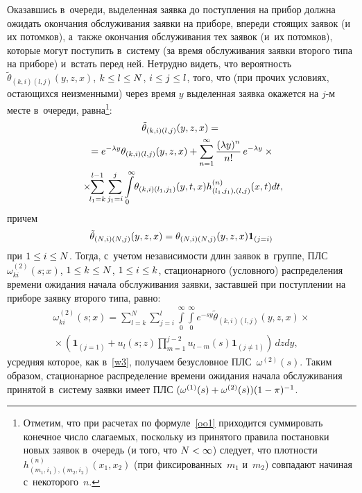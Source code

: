\begin{multicols}{2}
Оказавшись в~очереди, выделенная заявка до поступления 
на прибор должна ожидать окончания обслуживания заявки на 
приборе, впереди стоящих заявок (и их потомков), 
а~также окончания обслуживания тех заявок (и~их потомков), 
которые могут поступить в~систему (за время обслуживания заявки 
второго типа на приборе) и~встать перед ней. Нетрудно видеть, что
вероятность ${\tilde \theta}_{(k,i)(l,j)}(y,z,x)$,
${k \hm\le l\hm \le N}$, ${i\hm \le j\hm\le l}$, того, что
(при прочих условиях, остающихся неизменными)
через время $y$ выделенная заявка окажется на $j$-м месте
в~очереди, равна\footnote{Отметим, что
при расчетах по формуле~\eqref{oo1} приходится суммировать
конечное число слагаемых, поскольку из принятого правила
постановки новых заявок в~очередь (и того, что $N\hm<\infty$) следует,
что плотности $h^{(n)}_{(m_1,i_1),(m_2,i_2)}(x_1,x_2)$ 
(при фиксированных~$m_1$ и~$m_2$)
совпадают начиная с~некоторого~$n$.}:
\begin{multline}
\label{oo1}
{\tilde \theta}_{(k,i)(l,j)}(y,z,x) ={}\\
{}= e^{-\lambda y} \theta_{(k,i)(l,j)}(y,z,x) +
\sum\limits_{n=1}^\infty \displaystyle\frac{\displaystyle (\lambda y )^n \mathstrut}{\displaystyle n!\mathstrut}\,
e^{-\lambda y} \times{}\\
\!\times \!\!\sum\limits_{l_1=k}^{l-1} \sum\limits_{j_1=i}^{j}
\int\limits_0^\infty \!\theta_{(k,i)(l_1,j_1)}(y,t,x)
h^{(n)}_{(l_1,j_1),(l,j)}(x,t) dt,\!\!\!
\end{multline}
причем
$${\tilde \theta}_{(N,i)(N,j)}(y,z,x)\hm = \theta_{(N,i)(N,j)}(y,z,x) 
\mathbf{1}_{(j=i)}$$ 
при $1 \hm\le i\hm \le N$.
Тогда, с~учетом независимости длин заявок в~группе,
ПЛС $\omega^{(2)}_{ki}(s;x)$, $1 \hm\le k\hm \le N$, $1\hm \le i \hm\le k$, 
стационарного (условного) распределения времени ожидания начала обслуживания
заявки, заставшей при поступлении на приборе заявку второго типа, равно:
\begin{multline}
\label{oo3}
\omega^{(2)}_{ki}(s;x) =
\sum\limits_{l=k}^{N} \sum\limits_{j=i}^{l} \int\limits_0^\infty
\int\limits_0^\infty e^{-s y}
{\tilde \theta}_{(k,i)(l,j)}(y,z,x)
\times {}\\
\!\!{}\times
\left ( \mathbf{1}_{(j=1)} +
u_l(s;z) \prod\limits_{m=1}^{j-2} u_{l-m}(s) \mathbf{1}_{(j\neq 1)}
\right )\, dz dy, \!\!
\end{multline}
усредняя которое, как в~\eqref{w3}, получаем безусловное ПЛС~$\omega^{(2)}(s)$. 
Таким образом, стационарное распределение времени ожидания начала 
обслуживания принятой в~систему заявки имеет ПЛС
 $(\omega^{(1)}(s)\hm+\omega^{(2)}(s))(1\hm-\pi)^{-1}$.


\end{multicols}
